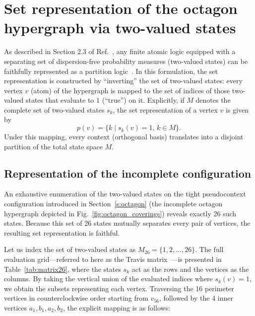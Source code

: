 \documentclass[
  twocolumn,
  aps,
  pra,
  floatfix,
  amsmath,amssymb,
  longbibliography
]{revtex4-2}
\theoremstyle{definition}
\theoremstyle{remark}
\begin{document}
\section{Set representation of the octagon hypergraph via two-valued states}
\label{app:set_representation}

As described in Section 2.3 of Ref.~\cite{svozil-2001-eua}, any finite atomic logic equipped with a separating set of dispersion-free probability measures (two-valued states) can be faithfully represented as a partition logic~\cite{ZirlSchl-65,greechie-66-PhD,kochen1}.
In this formulation, the set representation is constructed by ``inverting'' the set of two-valued states: every vertex $v$ (atom) of the hypergraph is mapped to the set of indices of those two-valued states that evaluate to $1$ (``true'') on it.
Explicitly, if $M$ denotes the complete set of two-valued states $s_k$, the set representation of a vertex $v$ is given by
\begin{equation}
    p(v) = \{k \mid s_k(v) = 1, \, k \in M\}.
\end{equation}
Under this mapping, every context (orthogonal basis) translates into a disjoint partition of the total state space $M$.

\subsection{Representation of the incomplete configuration}
\label{app:set_representation-incomplete}

An exhaustive enumeration of the two-valued states on the tight pseudocontext configuration introduced in Section~\ref{s:octagon} (the incomplete octagon hypergraph depicted in Fig.~\ref{fig:octagon_coverings}) reveals exactly 26 such states.
Because this set of 26 states mutually separates every pair of vertices, the resulting set representation is faithful.

Let us index the set of two-valued states as $M_{26} = \{1, 2, \dots, 26\}$.
The full evaluation grid---referred to here as the Travis matrix~\cite{travis-mt-62,greechie-66-PhD}---is presented in Table~\ref{tab:matrix26}, where the states $s_k$ act as the rows and the vertices as the columns.
By taking the vertical union of the evaluated indices where $s_k(v)=1$, we obtain the subsets representing each vertex.
Traversing the 16 perimeter vertices in counterclockwise order starting from $v_{56}$, followed by the 4 inner vertices $a_1, b_1, a_2, b_2$, the explicit mapping is as follows:
\end{document}
